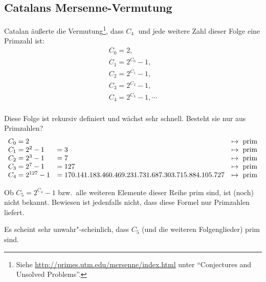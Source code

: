 \begin{refsegment}
\subsection[Catalans Mersenne-Vermutung]{Catalans Mersenne-Vermutung\footnotemark}
\nopagebreak
Catalan
äußerte die Vermutung\footnote{%
Siehe \url{http://primes.utm.edu/mersenne/index.html}
           unter "`Conjectures and Unsolved Problems"'.
         }, dass $ C_4 \;$ und jede weitere Zahl dieser Folge eine Primzahl ist:
$$
\begin{array}{l}
C_0 = 2, \\
C_1 = 2^{C_0} - 1,  \\
C_2 = 2^{C_1} - 1,  \\
C_3 = 2^{C_2} - 1, \\
C_4 = 2^{C_3} - 1, \cdots \\
\end{array}
$$

\noindent Diese Folge ist rekursiv definiert und wächst sehr schnell.
Besteht sie nur aus Primzahlen?
$$
\begin{array}{lll}
C_0 = 2 & & \mapsto {\rm ~prim}\\
C_1 = 2^2 - 1 &    = 3 & \mapsto {\rm ~prim}\\
C_2 = 2^3 - 1 &    = 7 & \mapsto {\rm ~prim} \\
C_3 = 2^7 - 1 &    = 127& \mapsto {\rm ~prim} \\
C_4 = 2^{127} - 1 &      = 170. 141. 183. 460. 469. 231. 731. 687. 303. 715. 884. 105. 727 & \mapsto {\rm ~prim} \\
\end{array}
$$

\noindent Ob $C_5 = 2^{C_4} - 1$ bzw.\ alle weiteren Elemente dieser Reihe prim sind,
ist (noch) nicht bekannt. Bewiesen ist jedenfalls nicht, dass diese Formel nur
Primzahlen liefert.

\noindent Es scheint sehr unwahr"-scheinlich, dass $C_5$ (und die weiteren Folgenglieder) prim sind.


\end{refsegment}
